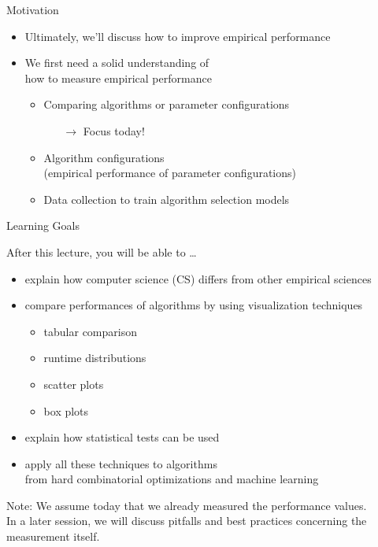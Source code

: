 \begin{frame}[c]{Motivation}

\begin{itemize}
  \item Ultimately, we'll discuss how to \alert{improve empirical performance}
  \bigskip
  \item We first need a solid understanding of\\how to \alert{measure empirical performance}
  \begin{itemize}
    \item Comparing algorithms or parameter configurations
    \begin{itemize}
      \item[$\to$] Focus today!
    \end{itemize}
    \item Algorithm configurations\\ (empirical performance of parameter configurations)
    \item Data collection to train algorithm selection models 
  \end{itemize}  
\end{itemize}

\end{frame}
\begin{frame}[c]{Learning Goals}

After this lecture, you will be able to \ldots

\begin{itemize}
  \item explain how computer science (CS) differs from other empirical sciences
  \item compare performances of algorithms by using \alert{visualization techniques}
  \begin{itemize}
    \item tabular comparison
    \item runtime distributions
    \item scatter plots
    \item box plots
  \end{itemize}
  \item explain how \alert{statistical tests} can be used 
  \item \alert{apply all these techniques} to algorithms\\ from hard combinatorial optimizations and machine learning
\end{itemize}

\pause

\alert{Note:} We assume today that we already measured the performance values.\\
In a later session, we will discuss pitfalls and best practices concerning the measurement itself.

\end{frame}

